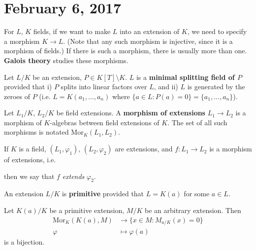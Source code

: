 \section{February 6, 2017}

\begin{rmk}
For $L$, $K$ fields, if we want to make $L$ into an extension of $K$, we need to specify a morphism $K \rightarrow L$. (Note that any such morphism is injective, since it is a morphism of fields.) If there is such a morphism, there is usually more than one. \textbf{Galois theory} studies these morphisms.
\end{rmk}

\begin{defn} \label{Defn 1, Feb 6}
Let $L/K$ be an extension, $P \in K[T] \setminus K$. $L$ is a \textbf{minimal splitting field of $P$} provided that i) $P$ splits into linear factors over $L$, and ii) $L$ is generated by the zeroes of $P$ (i.e. $L = K(a_1, ..., a_n)$ where $\{a \in L \colon P(a) = 0\} = \{a_1, ..., a_n\}$).
\end{defn}

\begin{defn} \label{Defn 2, Feb 6}
Let $L_1/K$, $L_2/K$ be field extensions. A \textbf{morphism of extensions} $L_1 \rightarrow L_2$ is a morphism of $K$-algebras between field extensions of $K$. The set of all such morphisms is notated Mor$_K(L_1, L_2)$.
\end{defn}

\begin{rmk}
If $K$ is a field, $(L_1, \varphi_1)$, $(L_2, \varphi_2)$ are extensions, and $f \colon L_1 \rightarrow L_2$ is a morphism of extensions, i.e.
\begin{center}
\end{center}
then we say that $f$ \textit{extends} $\varphi_2$.
\end{rmk}

\begin{defn} \label{Defn 3, Feb 6}
An extension $L/K$ is \textbf{primitive} provided that $L = K(a)$ for some $a \in L$.
\end{defn}

\begin{prop} \label{Prop 4, Feb 6}
Let $K(a)/K$ be a primitive extension, $M/K$ be an arbitrary extension. Then
\begin{align*}
\text{Mor}_K(K(a), M) &\rightarrow \{x \in M \colon M_{a/K}(x) = 0\} \\
\varphi &\mapsto \varphi(a)
\end{align*}
is a bijection.
\end{prop}


